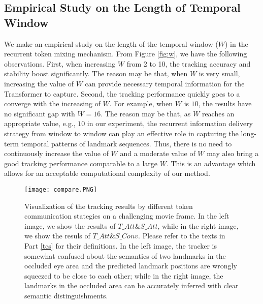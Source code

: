 \documentclass[review]{elsarticle}
\begin{document}
\subsection{Empirical Study on the Length of Temporal Window}
\label{esl}
We make an empirical study on the length of the temporal window ($W$) in the recurrent token mixing mechanism. From Figure \ref{fig:w}, we have the following observations. First, when increasing $W$ from 2 to 10, the tracking accuracy and stability boost significantly. The reason may be that, when $W$ is very small, increasing the value of $W$ can provide necessary temporal information for the Transformer to capture. Second, the tracking performance quickly goes to a converge with the increasing of $W$. For example, when $W$ is $10$, the results have no significant gap with $W=16$. The reason may be that, as $W$ reaches an appropriate value, e.g., $10$ in our experiment, the recurrent information delivery strategy from window to window can play an effective role in capturing the long-term temporal patterns of landmark sequences. Thus, there is no need to continuously increase the value of $W$ and a moderate value of $W$ may also bring a good tracking performance comparable to a large $W$. This is an advantage which allows for an acceptable computational complexity of our method.



\begin{figure}
	\centering
	\texttt{[image: compare.PNG]}
	\caption{Visualization of the tracking results by different token communication stategies on a challenging movie frame. In the left image, we show the results of $T\_Att\&S\_Att$, while in the right image, we show the resuls of $T\_Att\&S\_Conv$. Please refer to the texts in Part \ref{tcs} for their definitions. In the left image, the tracker is somewhat confused about the semantics of two landmarks in the occluded eye area and the predicted landmark positions are wrongly squeezed to be close to each other; while in the right image, the landmarks in the occluded area can be accurately inferred with clear semantic distinguishments.}
	\label{vis_0}
\end{figure}
\end{document}
